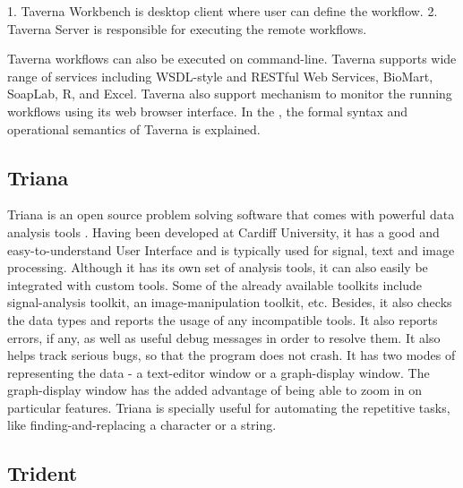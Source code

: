    1. Taverna Workbench is desktop client where user can define the
      workflow.
   2. Taverna Server is responsible for executing the remote
      workflows.

   Taverna workflows can also be executed on command-line.  Taverna
   supports wide range of services including WSDL-style and RESTful
   Web Services, BioMart, SoapLab, R, and Excel. Taverna also support
   mechanism to monitor the running workflows using its web browser
   interface.  In the \cite{taverna-paper}, the formal syntax
   and operational semantics of Taverna is explained.

\pv

\subsection{Triana}

   Triana is an open source problem solving software that comes with 
   powerful data analysis tools \cite{trianaDocumentation-1}.
   Having been developed at Cardiff University, it has a good and
   easy-to-understand User Interface and is typically used for signal,
   text and image processing.  Although it has its own set of analysis
   tools, it can also easily be integrated with custom tools.  Some of
   the already available toolkits include signal-analysis toolkit, an
   image-manipulation toolkit, etc.  Besides, it also checks the data
   types and reports the usage of any incompatible tools.  It also
   reports errors, if any, as well as useful debug messages in order
   to resolve them.  It also helps track serious bugs, so that the
   program does not crash.  It has two modes of representing the
   data - a text-editor window or a graph-display window.  The
   graph-display window has the added advantage of being able to zoom
   in on particular features.  Triana is specially useful for
   automating the repetitive tasks, like finding-and-replacing a
   character or a string.
   
\subsection{Trident}

